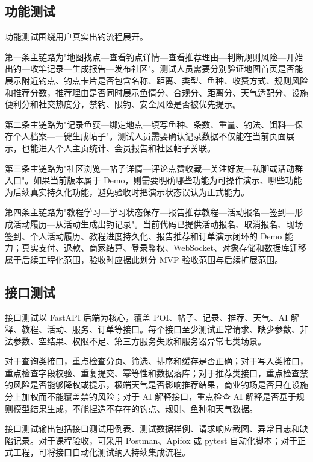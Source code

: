 \subsection{功能测试}

功能测试围绕用户真实出钓流程展开。

第一条主链路为"地图找点—查看钓点详情—查看推荐理由—判断规则风险—开始出钓—收竿记录—生成报告—发布社区"。测试人员需要分别验证地图首页是否能展示附近钓点、钓点卡片是否包含名称、距离、类型、鱼种、收费方式、规则风险和推荐分数，推荐理由是否同时展示鱼情分、合规分、距离分、天气适配分、设施便利分和社交热度分，禁钓、限钓、安全风险是否被优先提示。

第二条主链路为"记录鱼获—绑定地点—填写鱼种、条数、重量、钓法、饵料—保存个人档案—一键生成帖子"。测试人员需要确认记录数据不仅能在当前页面展示，也能进入个人主页统计、会员报告和社区帖子关联。

第三条主链路为"社区浏览—帖子详情—评论点赞收藏—关注好友—私聊或活动群入口"。如果当前版本属于 Demo，则需要明确哪些功能为可操作演示、哪些功能为后续真实持久化功能，避免验收时把演示状态误认为正式能力。

第四条主链路为"教程学习—学习状态保存—报告推荐教程—活动报名—签到—形成活动履历—从活动生成出钓记录"。当前代码已提供活动报名、取消报名、现场签到、个人活动履历、教程进度持久化、报告推荐和订单演示闭环的 Demo 能力；真实支付、退款、商家结算、登录鉴权、WebSocket、对象存储和数据库迁移属于后续工程化范围，验收时应据此划分 MVP 验收范围与后续扩展范围。

\subsection{接口测试}

接口测试以 FastAPI 后端为核心，覆盖 POI、帖子、记录、推荐、天气、AI 解释、教程、活动、服务、订单等接口。每个接口至少测试正常请求、缺少参数、非法参数、空结果、权限不足、第三方服务失败和服务器异常七类场景。

对于查询类接口，重点检查分页、筛选、排序和缓存是否正确；对于写入类接口，重点检查字段校验、重复提交、幂等性和数据落库；对于推荐类接口，重点检查禁钓风险是否能够降权或提示，极端天气是否影响推荐结果，商业钓场是否只在设施分上加权而不能覆盖禁钓风险；对于 AI 解释接口，重点检查 AI 解释是否基于规则模型结果生成，不能捏造不存在的钓点、规则、鱼种和天气数据。

接口测试输出包括接口测试用例表、测试数据样例、请求响应截图、异常日志和缺陷记录。对于课程验收，可采用 Postman、Apifox 或 pytest 自动化脚本；对于正式工程，可将接口自动化测试纳入持续集成流程。

